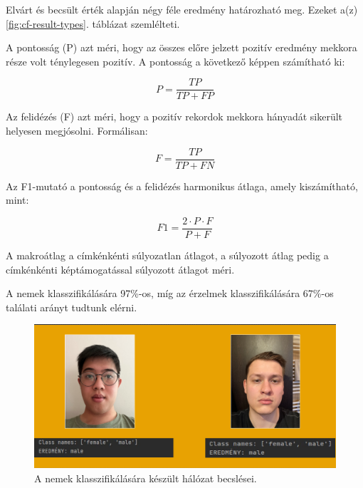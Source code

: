 \documentclass[12pt,a4]{article}
\begin{document}
            
            Elvárt és becsült érték alapján négy féle eredmény határozható meg. Ezeket a(z) \ref{fig:cf-result-types}. táblázat szemlélteti. 
            
            A pontosság (P) azt méri, hogy az összes előre jelzett pozitív eredmény mekkora része volt ténylegesen pozitív. A pontosság a következő képpen számítható ki:

            \begin{equation}
                P = \frac{TP}{TP + FP}
            \end{equation}
            
            Az felidézés (F) azt méri, hogy a pozitív rekordok mekkora hányadát sikerült helyesen megjósolni. Formálisan:

            \begin{equation}
                F = \frac{TP}{TP + FN}
            \end{equation}
            
            Az F1-mutató a pontosság és a felidézés harmonikus átlaga, amely kiszámítható, mint:

            \begin{equation}
                F1 = \frac{2 \cdot P \cdot F}{P + F}
            \end{equation}
            
            A makroátlag a címkénkénti súlyozatlan átlagot, a súlyozott átlag pedig a címkénkénti képtámogatással súlyozott átlagot méri.            
        
            A nemek klasszifikálására 97\%-os, míg az érzelmek klasszifikálására 67\%-os találati arányt tudtunk elérni.
    
                \begin{figure}[h!]	
            		\centering
            		\includegraphics[width=1\linewidth]{gender}
                    \caption{  A nemek klasszifikálására készült hálózat becslései.}
                    \label{fig:gender}
            	\end{figure}
            
\end{document}
